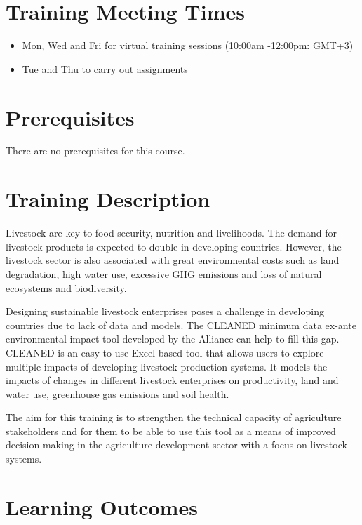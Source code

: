 \documentclass[
]{book}
\providecommand{\tightlist}{%
  \setlength{\itemsep}{0pt}\setlength{\parskip}{0pt}}
\begin{document}
\hypertarget{training-meeting-times}{%
\section{Training Meeting Times}\label{training-meeting-times}}

\begin{itemize}
\tightlist
\item
  Mon, Wed and Fri for virtual training sessions (10:00am -12:00pm: GMT+3)
\item
  Tue and Thu to carry out assignments
\end{itemize}

\hypertarget{prerequisites}{%
\section{Prerequisites}\label{prerequisites}}

There are no prerequisites for this course.

\hypertarget{training-description}{%
\section{Training Description}\label{training-description}}

Livestock are key to food security, nutrition and livelihoods. The demand for livestock products is expected to double in developing countries. However, the livestock sector is also associated with great environmental costs such as land degradation, high water use, excessive GHG emissions and loss of natural ecosystems and biodiversity.

Designing sustainable livestock enterprises poses a challenge in developing countries due to lack of data and models. The CLEANED minimum data ex-ante environmental impact tool developed by the Alliance can help to fill this gap. CLEANED is an easy-to-use Excel-based tool that allows users to explore multiple impacts of developing livestock production systems. It models the impacts of changes in different livestock enterprises on productivity, land and water use, greenhouse gas emissions and soil health.

The aim for this training is to strengthen the technical capacity of agriculture stakeholders and for them to be able to use this tool as a means of improved decision making in the agriculture development sector with a focus on livestock systems.

\hypertarget{learning-outcomes}{%
\section{Learning Outcomes}\label{learning-outcomes}}
\end{document}
